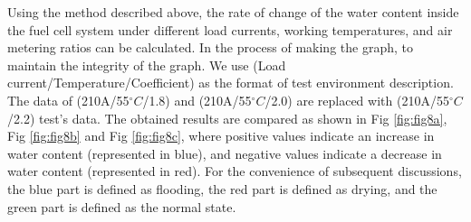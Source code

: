 \par
Using the method described above, the rate of change of the water content inside the fuel cell system under different load currents, working temperatures, and air metering ratios can be calculated. In the process of making the graph, to maintain the integrity of the graph. We use (Load current/Temperature/Coefficient) as the format of test environment description. The data of (210A/55$^{\circ}C$/1.8) and (210A/55$^{\circ}C$/2.0) are replaced with (210A/55$^{\circ}C$/2.2) test's data. The obtained results are compared as shown in Fig \ref{fig:fig8a}, Fig \ref{fig:fig8b} and Fig \ref{fig:fig8c}, where positive values indicate an increase in water content (represented in blue), and negative values indicate a decrease in water content (represented in red). For the convenience of subsequent discussions, the blue part is defined as flooding, the red part is defined as drying, and the green part is defined as the normal state.

